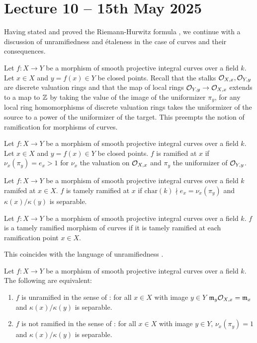 \section{Lecture 10 -- 15th May 2025}\label{sec: lecture 10}
Having stated and proved the Riemann-Hurwitz formula , we continue with a discussion of unramifiedness and \'{e}taleness in the case of curves and their consequences. 

Let $f:X\to Y$ be a morphism of smooth projective integral curves over a field $k$. Let $x\in X$ and $y=f(x)\in Y$ be closed points. Recall that the stalks $\mathcal{O}_{X,x},\mathcal{O}_{Y,y}$ are discrete valuation rings and that the map of local rings $\mathcal{O}_{Y,y}\to\mathcal{O}_{X,x}$ extends to a map to $\mathbb{Z}$ by taking the value of the image of the uniformizer $\pi_{y}$, for any local ring homomorphisms of discrete valuation rings takes the uniformizer of the source to a power of the uniformizer of the target. This preempts the notion of ramification for morphisms of curves.
\begin{definition}\label{def: ramification points}
    Let $f:X\to Y$ be a morphism of smooth projective integral curves over a field $k$. Let $x\in X$ and $y=f(x)\in Y$ be closed points. $f$ is ramified at $x$ if $\nu_{x}(\pi_{y})=e_{x}>1$ for $\nu_{x}$ the valuation on $\mathcal{O}_{X,x}$ and $\pi_{y}$ the uniformizer of $\mathcal{O}_{Y,y}$. 
\end{definition}
\begin{definition}\label{def: tamely ramified morphism at a point}
    Let $f:X\to Y$ be a morphism of smooth projective integral curves over a field $k$ ramifed at $x\in X$. $f$ is tamely ramified at $x$ if $\mathrm{char}(k)\nmid e_{x}=\nu_{x}(\pi_{y})$ and $\kappa(x)/\kappa(y)$ is separable. 
\end{definition}
\begin{definition}\label{def: tamely ramified morphism}
    Let $f:X\to Y$ be a morphism of smooth projective integral curves over a field $k$. $f$ is a tamely ramified morphism of curves if it is tamely ramified at each ramification point $x\in X$. 
\end{definition}
This coincides with the language of unramifiedness . 
\begin{lemma}\label{lem: unramifiedness notions agree}
    Let $f:X\to Y$ be a morphism of smooth projective integral curves over a field $k$. The following are equivalent:
    \begin{enumerate}[label=(\alph*)]
        \item $f$ is unramified in the sense of : for all $x\in X$ with image $y\in Y$ $\mathfrak{m}_{y}\mathcal{O}_{X,x}=\mathfrak{m}_{x}$ and $\kappa(x)/\kappa(y)$ is separable. 
        \item $f$ is not ramified in the sense of : for all $x\in X$ with image $y\in Y$, $\nu_{x}(\pi_{y})=1$ and $\kappa(x)/\kappa(y)$ is separable. 
    \end{enumerate}
\end{lemma}
